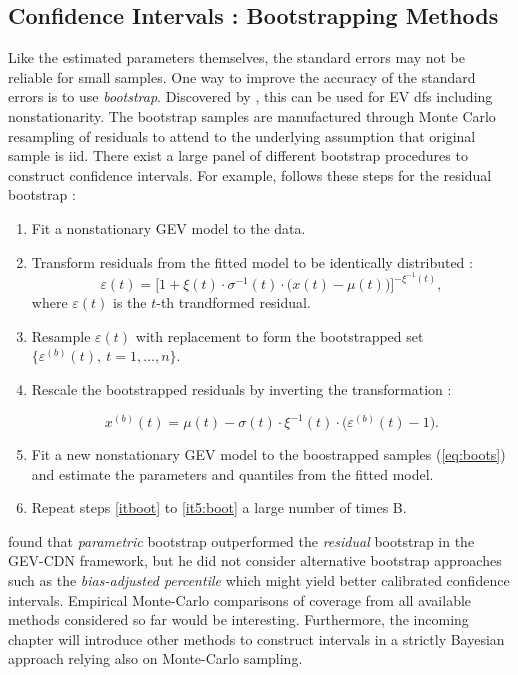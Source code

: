 \subsection{Confidence Intervals : Bootstrapping Methods}

Like the estimated parameters themselves, the standard errors may not be reliable for small samples. One way to improve the accuracy of the standard errors is to use \emph{bootstrap}. Discovered by \citet{efron1979}, this can be used for EV dfs including nonstationarity. The bootstrap samples are manufactured through
Monte Carlo resampling of residuals to attend to the underlying assumption  that original sample is iid.
There exist a large panel of different bootstrap procedures to construct confidence intervals.  For example, \citet{2006JHyd..329..534K} follows these steps for the residual bootstrap : 
 
\begin{enumerate}
	\item\label{itboot} Fit a nonstationary GEV model to the data.
	\item Transform residuals from the fitted model to be identically distributed :
	\begin{equation*}
	\varepsilon(t)=\bigg[1+\xi(t)\cdot\sigma^{-1}(t)\cdot\Big(x(t)-\mu(t)\Big)\bigg]^{-\xi^{-1}(t)},
	\end{equation*}
	where $\varepsilon(t)$ is the $t$-th trandformed residual.
	
	\item Resample $\varepsilon(t)$ with replacement to form the bootstrapped set $\Big\{\varepsilon^{(b)}(t), \ t=1,\ldots,n\Big\}$.
	
	\item Rescale the bootstrapped residuals by inverting the transformation : 
	
	\begin{equation}\label{eq:boots}
	x^{(b)}(t)=\mu(t)-\sigma(t)\cdot\xi^{-1}(t)\cdot\Big(\varepsilon^{(b)}(t)-1\Big).
	\end{equation}
	\item\label{it5:boot} Fit a new nonstationary GEV  model to the boostrapped samples (\ref{eq:boots}) and estimate the parameters and quantiles from the fitted model. 
	\item Repeat steps \ref{itboot} to \ref{it5:boot} a large number of times B.
	
\end{enumerate}

\citet{cannon_flexible_2010} found that \emph{parametric} bootstrap outperformed the \emph{residual} bootstrap in the GEV-CDN framework, but he did not consider alternative bootstrap approaches such as the \emph{bias-adjusted percentile} which might yield better calibrated confidence intervals.
Empirical Monte-Carlo comparisons of coverage from all available methods considered so far would be interesting. Furthermore, the incoming chapter will introduce other methods to construct intervals in a strictly Bayesian approach  relying also on Monte-Carlo sampling.
